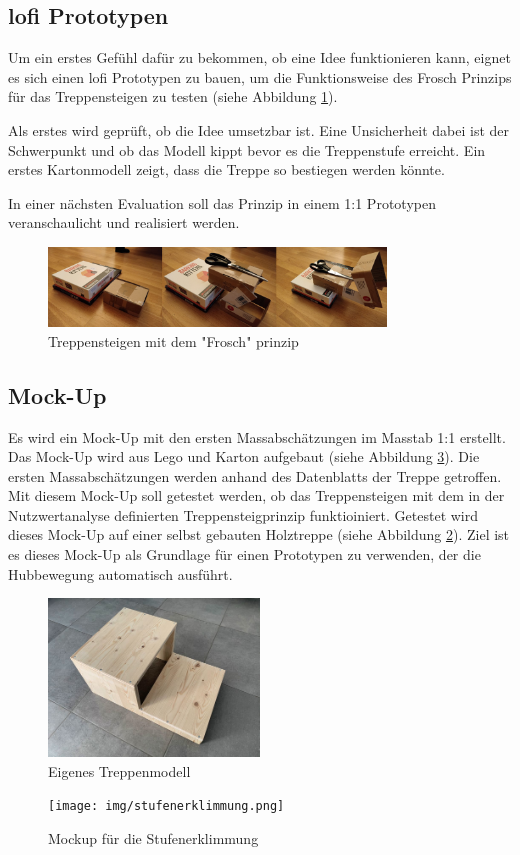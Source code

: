 \subsection*{\acrshort{lofi} Prototypen}
Um ein erstes Gefühl dafür zu bekommen, ob eine Idee funktionieren kann, eignet es 
sich einen \acrfull{lofi} Prototypen zu bauen, um die Funktionsweise
des \glqq Frosch\grqq{} Prinzips für das Treppensteigen zu testen (siehe Abbildung \ref{fig:frosch-prinzip}).

Als erstes wird geprüft, ob die Idee umsetzbar ist.
Eine Unsicherheit dabei ist der Schwerpunkt und ob das Modell kippt
bevor es die Treppenstufe erreicht. Ein erstes Kartonmodell zeigt,
dass die Treppe so bestiegen werden könnte.

In einer nächsten Evaluation soll das Prinzip in einem 1:1 Prototypen veranschaulicht und realisiert werden.

\begin{figure}[h]
  \includegraphics[width=0.8\textwidth]{img/frosch.png}
  \centering
  \caption{Treppensteigen mit dem "Frosch" prinzip}
  \label{fig:frosch-prinzip}
\end{figure}


\subsection*{Mock-Up}
 Es wird ein Mock-Up mit den ersten Massabschätzungen im Masstab 1:1 erstellt. Das Mock-Up wird aus Lego und Karton aufgebaut (siehe Abbildung \ref{fig:mockup-stufenerklimmung}). Die ersten Massabschätzungen werden anhand des Datenblatts der Treppe getroffen. Mit diesem Mock-Up soll getestet werden, ob das Treppensteigen mit dem in der Nutzwertanalyse definierten Treppensteigprinzip funktioiniert. Getestet wird dieses Mock-Up auf einer selbst gebauten Holztreppe (siehe Abbildung \ref{fig:eigenes-treppenmodell}).
 Ziel ist es dieses Mock-Up als Grundlage für einen Prototypen zu verwenden, der die Hubbewegung automatisch ausführt.
 
 \begin{figure}[H]
  \includegraphics[width=0.5\textwidth]{img/modell_treppe_1.png}
  \centering
  \caption{Eigenes Treppenmodell}
  \label{fig:eigenes-treppenmodell}
\end{figure}

   
\newpage

\begin{figure}[H]
  \texttt{[image: img/stufenerklimmung.png]}
  \centering
  \caption{Mockup für die Stufenerklimmung}
  \label{fig:mockup-stufenerklimmung}
\end{figure}
   
\newpage